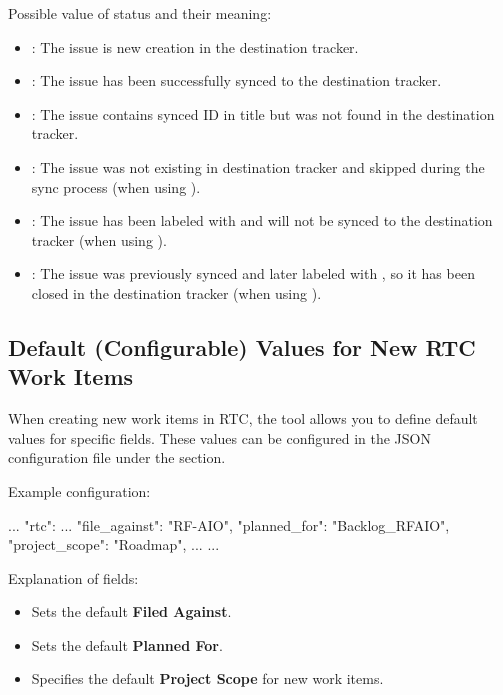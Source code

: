 Possible value of status and their meaning:
\begin{itemize}
   \item {}: The issue is new creation in the destination tracker.
   \item {}: The issue has been successfully synced to the
                         destination tracker.
   \item {}: The issue contains synced ID in title but was not
                            found in the destination tracker.
   \item {}: The issue was not existing in destination tracker and
                          skipped during the sync process (when using
                          ).
   \item {}: The issue has been labeled with  and will
                         not be synced to the destination tracker (when using
                         ).
   \item {}: The issue was previously synced and later labeled
                                with , so it has been closed in the
                                destination tracker (when using ).
\end{itemize}

\subsection{Default (Configurable) Values for New RTC Work Items}
When creating new work items in RTC, the tool allows you to define default
values for specific fields.
These values can be configured in the JSON configuration file under the
 section.

Example configuration:
\begin{pythoncode}
{
   ...
   "rtc": {
      ...
      "file_against": "RF-AIO",
      "planned_for": "Backlog_RFAIO",
      "project_scope": "Roadmap",
      ...
   }
   ...
}
\end{pythoncode}

Explanation of fields:
\begin{itemize}
   \item {} Sets the default \textbf{Filed Against}.
   \item {} Sets the default \textbf{Planned For}.
   \item {} Specifies the default \textbf{Project Scope} for
         new work items.
\end{itemize}

